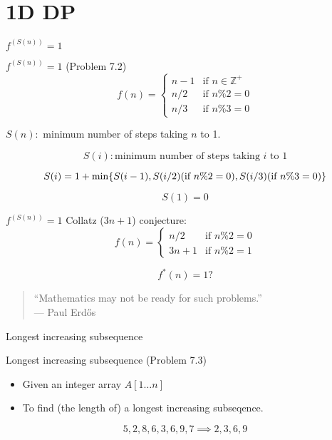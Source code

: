 \section{1D DP}

\begin{frame}{$f^{(S(n))} = 1$}
  \begin{exampleblock}{$f^{(S(n))} = 1$ (Problem 7.2)}
	\begin{displaymath}
	  f(n) = \begin{cases}
		n - 1 & \text{if } n \in \mathbb{Z}^{+} \\
		n / 2 & \text{if } n \% 2 = 0 \\
		n / 3 & \text{if } n \% 3 = 0
	  \end{cases}
	\end{displaymath}

	\centerline{$S(n):$ minimum number of steps taking $n$ to 1.}
  \end{exampleblock}

  \pause
  \[
	S(i): \text{minimum number of steps taking } i \text{ to } 1
  \]

  \pause
  \[
	S(i) = 1 + \min \{S(i-1), S(i/2) (\text{if } n\%2 = 0), S(i/3) (\text{if } n\%3 = 0)\}
  \]

  \[
	S(1) = 0
  \]
\end{frame}
\begin{frame}{$f^{(S(n))} = 1$}
  Collatz ($3n+1$) conjecture:
  \begin{displaymath}
	f(n) = \begin{cases}
	  n / 2 & \text{if } n \% 2 = 0 \\
	  3n + 1 & \text{if } n \% 2 = 1
	\end{cases}
  \end{displaymath}

  \[
	f^{\ast}(n) = 1 ?
  \]

  \pause
  \vspace{0.50cm}
  \begin{quote}
	``Mathematics may not be ready for such problems.''\\
	\hfill --- Paul Erdős
  \end{quote}
\end{frame}
\begin{frame}{Longest increasing subsequence}
  \begin{exampleblock}{Longest increasing subsequence (Problem 7.3)}
    \begin{itemize}
      \item Given an integer array $A[1 \ldots n]$
      \item To find (the length of) a longest increasing subseqence.
    \end{itemize}
  \end{exampleblock}

  \[
    5,2,8,6,3,6,9,7 \implies 2, 3, 6, 9
  \]
\end{frame}
